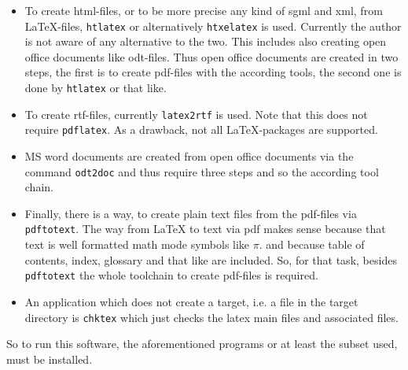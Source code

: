 \documentclass[12pt]{book}
\newcommand{\gls}[1]{#1}
\renewcommand{\index}[1]{ }
\begin{document}
\begin{itemize}
****
\item
To create \gls{html}-files, 
or to be more precise any kind of \gls{sgml} and \gls{xml}, 
from \LaTeX-files, \texttt{htlatex} or alternatively \texttt{htxelatex} is used. 
Currently the author is not aware of any alternative to the two. 
This includes also creating open office documents like odt-files. 
Thus open office documents are created in two steps, 
the first is to create pdf-files with the according tools, 
the second one is done by \texttt{htlatex} or that like. 
\index{htlatex}\index{htxelatex}
\item
To create rtf-files, currently \texttt{latex2rtf} is used. 
Note that this does not require \texttt{pdflatex}. 
As a drawback, not all \LaTeX-packages are supported. 
\index{latex2rtf}
\item
MS word documents are created from open office documents 
via the command \texttt{odt2doc} and thus require three steps 
and so the according tool chain. 
\index{odt2doc} 
\item
Finally, there is a way, to create plain text files from the pdf-files 
via \texttt{pdftotext}. 
The way from \LaTeX{} to text via pdf makes sense 
because that text is well formatted math mode symbols like $\pi$. 
and because table of contents, index, glossary and that like are included. 
So, for that task, besides \texttt{pdftotext} the whole toolchain to create
pdf-files is required. 
\index{pdftotext}
\item
An application which does not create a target, 
i.e. a file in the target directory is \texttt{chktex} 
which just checks the latex main files and associated files. 
\end{itemize}

So to run this software, the aforementioned programs 
or at least the subset used, must be installed. 
\end{document}
